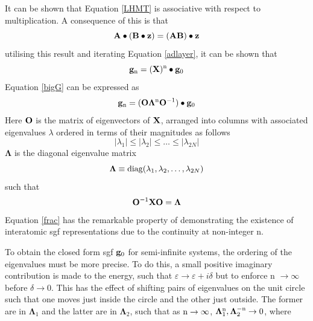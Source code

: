 \documentclass[a4paper, 12pt]{article}
\begin{document}

It can be shown that Equation \eqref{LHMT} is associative with respect to multiplication. A consequence of this is that 
\begin{equation}
\bf A\bullet(B\bullet z) = (AB)\bullet z
\end{equation}
utilising this result and iterating Equation \eqref{adlayer}, it can be shown that
\begin{equation}\label{bigG}
	{\bf g}_{\rm n} = ({\bf X})^{\rm n}\bullet {\bf g}_0
\end{equation}
Equation \eqref{bigG} can be expressed as 
\begin{equation}\label{frac}
	{\bf g}_{\rm n} = ({\bf O}\bm\Lambda^{\rm n}{\bf O}^{-1})\bullet {\bf g}_0
\end{equation}
Here ${\bf O}$ is the matrix of eigenvectors of ${\bf X}$, arranged into columns with associated eigenvalues $\lambda$ ordered in terms of their magnitudes as follows
\begin{equation}
	| {\lambda}_1 | \leq | {\lambda}_2 | \leq \ldots \leq | {\lambda}_{2N} |
\end{equation}
$\bm \Lambda$ is the diagonal eigenvalue matrix
\begin{equation}
	\bm \Lambda \equiv {\rm diag}(\lambda_1,\lambda_2,\dots,\lambda_{2N})
\end{equation}
such that 
	\begin{equation}
		{\bf O}^{-1} {\bf X}{\bf O} = \bm \Lambda
	\end{equation}
	Equation \eqref{frac} has the remarkable property of demonstrating the existence of interatomic \gls{sgf} representations due to the continuity at non-integer n.
	\par To obtain the closed form \gls{sgf} ${\bf g}_0$ for semi-infinite systems, the ordering of the eigenvalues must be more precise. To do this, a small positive imaginary contribution is made to the energy, such that $\varepsilon \longrightarrow \varepsilon+i\delta$ but to enforce n $\rightarrow \infty$ before $\delta \rightarrow 0$. This has the effect of shifting pairs of eigenvalues on the unit circle such that one moves just inside the circle and the other just outside. The former are in $\bm \Lambda_1$ and the latter are in $\bm \Lambda_2$, such that as $\rm n\rightarrow\infty$, \quad $\bm\Lambda_1^{\rm n}, \bm\Lambda_2^{-\rm n}\rightarrow 0$, where
\end{document}
